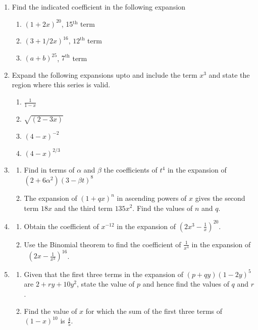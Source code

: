 \documentclass[11pt,a4paper]{article}
\theoremstyle{definition}
\begin{document}
\begin{enumerate}
\item Find the indicated coefficient in the following expansion
\begin{enumerate}
     \item $(1+2x)^{20}$, 15$^{\text{th}}$ term
     \item $(3+1/2x)^{16}$, $12^{\text{th}}$ term
     \item $(a+b)^{25}$, $7^{\text{th}}$ term\\
\end{enumerate}

\item Expand the following expansions upto and include the term $x^3$ and state the region where this series is valid.
\begin{enumerate}
     \item $\frac{1}{1-x}$
     \item $\sqrt{(2-3x)}$
     \item $(4-x)^{-2}$
     \item $(4-x)^{2/3}$\\
\end{enumerate}

\item
\begin{enumerate}
     \item Find in terms of $\alpha$ and $\beta$ the coefficients of $t^4$ in the expansion of\\ $(2+6\alpha^2)(3-\beta t)^8$
     \item The expansion of $(1+qx)^n$ in ascending powers of $x$ gives the second term $18x$ and the third term $135x^2$. Find the values of $n$ and $q$.\\
\end{enumerate}

\item
\begin{enumerate}
      \item Obtain the coefficient of $x^{-12}$ in the expansion of $\left(2x^3-\frac{1}{x}\right)^{20}$.
      \item Use the Binomial theorem to find the coefficient of $\frac{1}{x^4}$ in the expansion of\\\ $\left(2x-\frac{1}{x^3}\right)^{16}$.\\
\end{enumerate}

\item
\begin{enumerate}
     \item Given that the first three terms in the expansion of $(p+qy)(1-2y)^5$ are $2+ry+10y^2$, state the value of $p$ and hence find the values of $q$ and $r$.
     \item Find the value of $x$ for which the sum of the first three terms of $(1-x)^{10}$ is $\frac{4}{5}$.\\     
\end{enumerate}


\end{enumerate}
\end{document}
